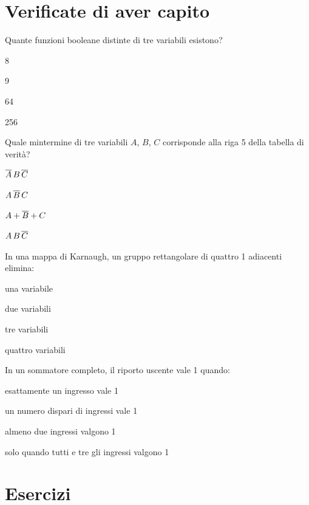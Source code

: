 



\section{Verificate di aver capito}

\begin{quiz}{Quante funzioni booleane distinte di tre variabili esistono?}
\item 8
\item 9
\item 64
\item 256
\end{quiz}

\begin{quiz}{Quale mintermine di tre variabili $A$, $B$, $C$ corrisponde alla riga 5 della tabella di verità?}
\item $\overline{A}\,B\,\overline{C}$
\item $A\,\overline{B}\,C$
\item $A+\overline{B}+C$
\item $A\,B\,\overline{C}$
\end{quiz}

\begin{quiz}{In una mappa di Karnaugh, un gruppo rettangolare di quattro 1 adiacenti elimina:}
\item una variabile
\item due variabili
\item tre variabili
\item quattro variabili
\end{quiz}

\begin{quiz}{In un sommatore completo, il riporto uscente vale 1 quando:}
\item esattamente un ingresso vale 1
\item un numero dispari di ingressi vale 1
\item almeno due ingressi valgono 1
\item solo quando tutti e tre gli ingressi valgono 1
\end{quiz}

\section{Esercizi}


